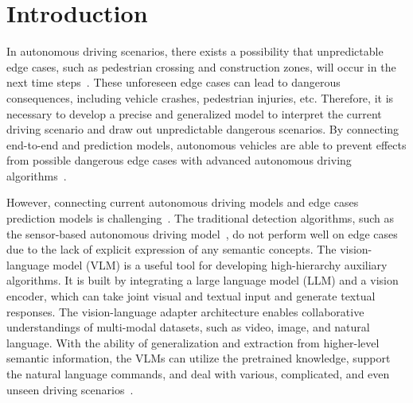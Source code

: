 \section{Introduction}
In autonomous driving scenarios, there exists a possibility that unpredictable edge cases, such as pedestrian crossing and construction zones, will occur in the next time steps~\cite{feng2023dense}. These unforeseen edge cases can lead to dangerous consequences, including vehicle crashes, pedestrian injuries, etc.
Therefore, it is necessary to develop a precise and generalized model to interpret the current driving scenario and draw out unpredictable dangerous scenarios. By connecting end-to-end and prediction models, autonomous vehicles are able to prevent effects from possible dangerous edge cases with advanced autonomous driving algorithms~\cite{chen2024end}. 

However, connecting current autonomous driving models and edge cases prediction models is challenging~\cite{feng2023dense}. The traditional detection algorithms, such as the sensor-based autonomous driving model~\cite{ribeiro2016should}, do not perform well on edge cases due to the lack of explicit expression of any semantic concepts. 
% 
The vision-language model (VLM) is a useful tool for developing high-hierarchy auxiliary algorithms. It is built by integrating a large language model (LLM) and a vision encoder,  which can take joint visual and textual input and generate textual responses. The vision-language adapter architecture enables collaborative understandings of multi-modal datasets, such as video, image, and natural language. With the ability of generalization and extraction from higher-level semantic information, the VLMs can utilize the pretrained knowledge, support the natural language commands, and deal with various, complicated, and even unseen driving scenarios~\cite{cui2023drivellm,Pan2024VLP}.
% 

